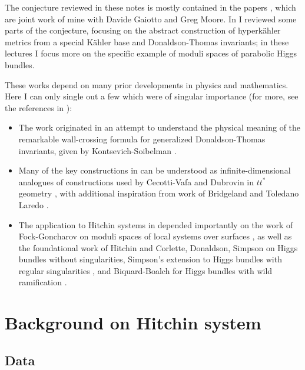 \documentclass[12pt,letterpaper,reqno]{article}
\newcounter{papers}\setcounter{papers}{0}
\numberwithin{equation}{section}
\newcommand{\kahler}{K\"ahler\xspace}
\newcommand{\hk}{hyperk\"ahler\xspace}
\begin{document}
The conjecture reviewed in these notes is mostly contained in 
the papers \cite{Gaiotto:2008cd,Gaiotto:2009hg},
which are joint work of mine with Davide Gaiotto and Greg
Moore.
In \cite{notes-hk} I reviewed some parts of the conjecture,
focusing on the abstract construction of \hk metrics from a
special \kahler base and Donaldson-Thomas invariants;
in these lectures I focus more on the specific example
of moduli spaces of parabolic Higgs bundles.

These works depend on many prior developments
in physics and mathematics. Here I can only single out a few
which were of singular importance (for more, see the references
in \cite{Gaiotto:2008cd,Gaiotto:2009hg}):
\begin{itemize}
\item The work \cite{Gaiotto:2008cd} 
originated in an attempt to understand the physical
meaning of the remarkable wall-crossing formula for generalized
Donaldson-Thomas invariants, given by Kontsevich-Soibelman \cite{ks1}.
\item Many of the key constructions in 
\cite{Gaiotto:2008cd} can
be understood as infinite-dimensional analogues 
of constructions used by Cecotti-Vafa and Dubrovin in 
$tt^*$ geometry \cite{Cecotti:1993rm,MR1213301}, with
additional inspiration from work of Bridgeland and 
Toledano Laredo \cite{stab-stokes}.
\item The application to Hitchin systems
in \cite{Gaiotto:2009hg} depended importantly on
the work of Fock-Goncharov on moduli spaces
of local systems over surfaces \cite{MR2233852},
as well as the foundational work
of Hitchin \cite{MR89a:32021} and Corlette, Donaldson, Simpson
\cite{MR965220,MR887285,MR944577} on Higgs bundles without
singularities, Simpson's extension to 
Higgs bundles with regular 
singularities \cite{hbnc}, and Biquard-Boalch for Higgs
bundles with wild ramification \cite{wnh}.
\end{itemize}

\section{Background on Hitchin system}

\subsection{Data}
\end{document}

